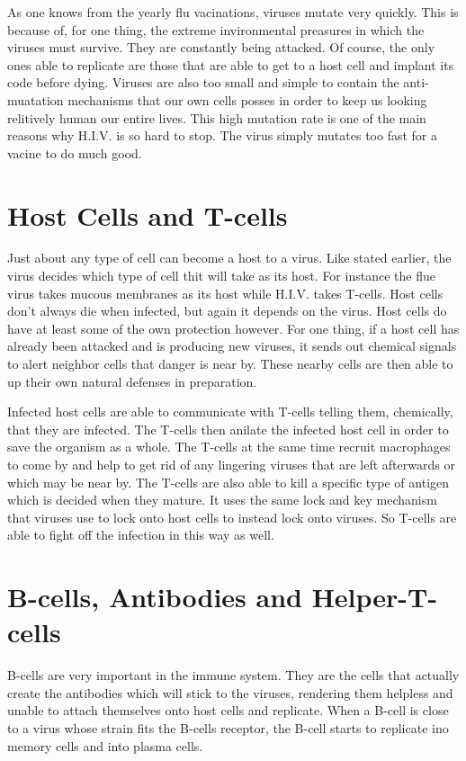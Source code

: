 \documentclass[12pt ]{report}
\begin{document}
As one knows from the yearly flu vacinations, viruses mutate very quickly.  This is because of, for one thing, the extreme invironmental preasures in which the viruses must survive.  They are constantly being attacked.  Of course, the only ones able to replicate are those that are able to get to a host cell and implant its code before dying.  Viruses are also too small and simple to contain the anti-muatation mechanisms that our own cells posses in order to keep us looking relitively human our entire lives.  This high mutation rate is one of the main reasons why H.I.V. is so hard to stop.  The virus simply mutates too fast for a vacine to do much good.
\section*{Host Cells and T-cells}
Just about any type of cell can become a host to a virus.  Like stated earlier, the virus decides which type of cell thit will take as its host.  For instance the flue virus takes mucous membranes as its host while H.I.V. takes T-cells.  Host cells don't always die when infected, but again it depends on the virus.
Host cells do have at least some of the own protection however.  For one thing, if a host cell has already been attacked and is producing new viruses, it sends out chemical signals to alert neighbor cells that danger is near by.  These nearby cells are then able to up their own natural defenses in preparation.  

Infected host cells are able to communicate with T-cells telling them, chemically, that they are infected.  The T-cells then anilate the infected host cell in order to save the organism as a whole.  The T-cells at the same time recruit macrophages to come by and help to get rid of any lingering viruses that are left afterwards or which may be near by.  The T-cells are also able to kill a specific type of antigen which is decided when they mature.  It uses the same lock and key mechanism that viruses use to lock onto host cells to instead lock onto viruses.  So T-cells are able to fight off the infection in this way as well.
\section*{B-cells, Antibodies and Helper-T-cells}
B-cells are very important in the immune system.  They are the cells that actually create the antibodies which will stick to the viruses, rendering them helpless and unable to attach themselves onto host cells and replicate.  When a B-cell is close to a virus whose strain fits the B-cells receptor, the B-cell starts to replicate ino memory cells and into plasma cells.  
\end{document}
